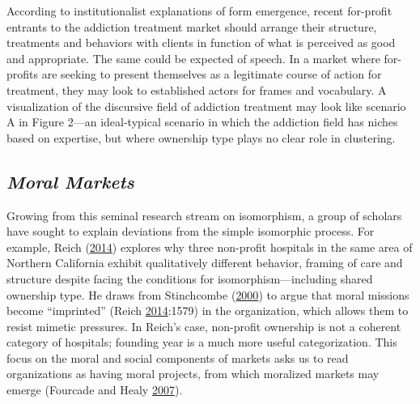 \documentclass[
  12pt,
]{article}
\begin{document}
\vspace{12pt}

According to institutionalist explanations of form emergence, recent for-profit entrants to the addiction treatment market should arrange their structure, treatments and behaviors with clients in function of what is perceived as good and appropriate. The same could be expected of speech. In a market where for-profits are seeking to present themselves as a legitimate course of action for treatment, they may look to established actors for frames and vocabulary. A visualization of the discursive field of addiction treatment may look like scenario A in Figure 2---an ideal-typical scenario in which the addiction field has niches based on expertise, but where ownership type plays no clear role in clustering.

\hypertarget{moral-markets}{%
\subsection{\texorpdfstring{\emph{Moral Markets}}{Moral Markets}}\label{moral-markets}}

Growing from this seminal research stream on isomorphism, a group of scholars have sought to explain deviations from the simple isomorphic process. For example, Reich (\protect\hyperlink{ref-reich2014}{2014}) explores why three non-profit hospitals in the same area of Northern California exhibit qualitatively different behavior, framing of care and structure despite facing the conditions for isomorphism---including shared ownership type. He draws from Stinchcombe (\protect\hyperlink{ref-stinchcombe2000}{2000}) to argue that moral missions become ``imprinted'' (Reich \protect\hyperlink{ref-reich2014}{2014}:1579) in the organization, which allows them to resist mimetic pressures. In Reich's case, non-profit ownership is not a coherent category of hospitals; founding year is a much more useful categorization. This focus on the moral and social components of markets asks us to read organizations as having moral projects, from which moralized markets may emerge (Fourcade and Healy \protect\hyperlink{ref-fourcade2007}{2007}).

\vspace{12pt}
\end{document}
